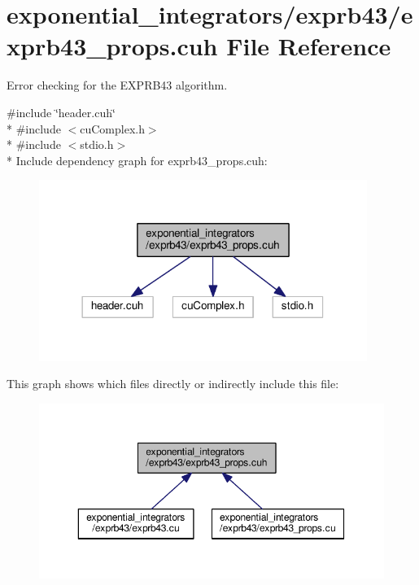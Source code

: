 \hypertarget{exprb43__props_8cuh}{}\section{exponential\+\_\+integrators/exprb43/exprb43\+\_\+props.cuh File Reference}
\label{exprb43__props_8cuh}


Error checking for the E\+X\+P\+R\+B43 algorithm.  


{\ttfamily \#include \char`\"{}header.\+cuh\char`\"{}}\\*
{\ttfamily \#include $<$cu\+Complex.\+h$>$}\\*
{\ttfamily \#include $<$stdio.\+h$>$}\\*
Include dependency graph for exprb43\+\_\+props.\+cuh\+:\nopagebreak
\begin{figure}[H]
\begin{center}
\leavevmode
\includegraphics[width=302pt]{exprb43__props_8cuh__incl}
\end{center}
\end{figure}
This graph shows which files directly or indirectly include this file\+:\nopagebreak
\begin{figure}[H]
\begin{center}
\leavevmode
\includegraphics[width=350pt]{exprb43__props_8cuh__dep__incl}
\end{center}
\end{figure}
